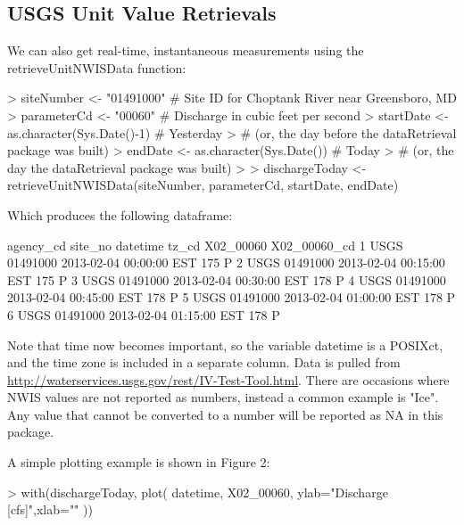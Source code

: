 \documentclass[a4paper,11pt]{article}
\begin{document}
\subsection{USGS Unit Value Retrievals}
We can also get real-time, instantaneous measurements using the retrieveUnitNWISData function:
\begin{Schunk}
\begin{Sinput}
> siteNumber <- "01491000" # Site ID for Choptank River near Greensboro, MD
> parameterCd <- "00060"  # Discharge in cubic feet per second
> startDate <- as.character(Sys.Date()-1) # Yesterday 
>   # (or, the day before the dataRetrieval package was built)
> endDate <- as.character(Sys.Date()) # Today 
>   # (or, the day the dataRetrieval package was built)
> 
> dischargeToday <- retrieveUnitNWISData(siteNumber, parameterCd, 
         startDate, endDate)
\end{Sinput}
\end{Schunk}
Which produces the following dataframe:
\begin{Schunk}
\begin{Soutput}
  agency_cd  site_no            datetime tz_cd X02_00060 X02_00060_cd
1      USGS 01491000 2013-02-04 00:00:00   EST       175            P
2      USGS 01491000 2013-02-04 00:15:00   EST       175            P
3      USGS 01491000 2013-02-04 00:30:00   EST       178            P
4      USGS 01491000 2013-02-04 00:45:00   EST       178            P
5      USGS 01491000 2013-02-04 01:00:00   EST       178            P
6      USGS 01491000 2013-02-04 01:15:00   EST       178            P
\end{Soutput}
\end{Schunk}

Note that time now becomes important, so the variable datetime is a POSIXct, and the time zone is included in a separate column. Data is pulled from \url{http://waterservices.usgs.gov/rest/IV-Test-Tool.html}. There are occasions where NWIS values are not reported as numbers, instead a common example is "Ice".  Any value that cannot be converted to a number will be reported as NA in this package.

A simple plotting example is shown in Figure 2:
\begin{Schunk}
\begin{Sinput}
> with(dischargeToday, plot(
   datetime, X02_00060,
   ylab="Discharge [cfs]",xlab=""
   ))
\end{Sinput}
\end{Schunk}
\newpage
\end{document}
